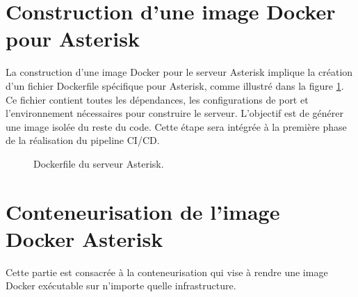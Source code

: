 \section{Construction d'une image Docker pour Asterisk} 
La construction d'une image Docker pour le serveur Asterisk implique la création d'un fichier Dockerfile spécifique pour Asterisk, comme illustré dans la figure \ref{fig:dc1}. Ce fichier contient toutes les dépendances, les configurations de port et l'environnement nécessaires pour construire le serveur. L'objectif est de générer une image isolée du reste du code. Cette étape sera intégrée à la première phase de la réalisation du pipeline CI/CD.
\begin{figure}[H]
        \centering
        \caption{Dockerfile du serveur Asterisk.}
        \label{fig:dc1}
        \end{figure}
        
\section{Conteneurisation de l'image Docker Asterisk} 
Cette partie est consacrée à la conteneurisation qui vise à rendre une image Docker exécutable sur n'importe quelle infrastructure.

